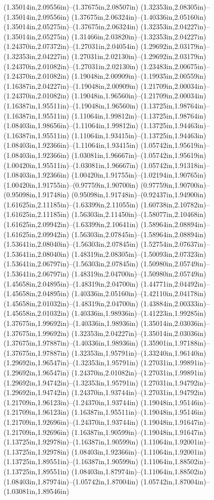 (1.35014in,2.09556in)--(1.37675in,2.08507in) (1.32353in,2.08305in)--(1.35014in,2.09556in) (1.37675in,2.06324in)--(1.40336in,2.05160in) (1.35014in,2.05275in)--(1.37675in,2.06324in) (1.32353in,2.04227in)--(1.35014in,2.05275in) (1.31466in,2.03820in)--(1.32353in,2.04227in) (1.24370in,2.07372in)--(1.27031in,2.04054in) (1.29692in,2.03179in)--(1.32353in,2.04227in) (1.27031in,2.02130in)--(1.29692in,2.03179in) (1.24370in,2.01082in)--(1.27031in,2.02130in) (1.23483in,2.00675in)--(1.24370in,2.01082in) (1.19048in,2.00909in)--(1.19935in,2.00559in) (1.16387in,2.04227in)--(1.19048in,2.00909in) (1.21709in,2.00034in)--(1.24370in,2.01082in) (1.19048in,1.96560in)--(1.21709in,2.00034in) (1.16387in,1.95511in)--(1.19048in,1.96560in) (1.13725in,1.98764in)--(1.16387in,1.95511in) (1.11064in,1.99812in)--(1.13725in,1.98764in) (1.08403in,1.98656in)--(1.11064in,1.99812in) (1.13725in,1.94463in)--(1.16387in,1.95511in) (1.11064in,1.93415in)--(1.13725in,1.94463in) (1.08403in,1.92366in)--(1.11064in,1.93415in) (1.05742in,1.95619in)--(1.08403in,1.92366in) (1.03081in,1.96667in)--(1.05742in,1.95619in) (1.00420in,1.95511in)--(1.03081in,1.96667in) (1.05742in,1.91318in)--(1.08403in,1.92366in) (1.00420in,1.91755in)--(1.02194in,1.90765in) (1.00420in,1.91755in)--(0.97759in,1.90700in) (0.97759in,1.90700in)--(0.95098in,1.91748in) (0.95098in,1.91748in)--(0.92437in,1.94900in) (1.61625in,2.11185in)--(1.63399in,2.11055in) (1.60738in,2.10782in)--(1.61625in,2.11185in) (1.56303in,2.11450in)--(1.58077in,2.10468in) (1.61625in,2.09942in)--(1.63399in,2.10641in) (1.58964in,2.08894in)--(1.61625in,2.09942in) (1.56303in,2.07845in)--(1.58964in,2.08894in) (1.53641in,2.08040in)--(1.56303in,2.07845in) (1.52754in,2.07637in)--(1.53641in,2.08040in) (1.48319in,2.08305in)--(1.50093in,2.07323in) (1.53641in,2.06797in)--(1.56303in,2.07845in) (1.50980in,2.05749in)--(1.53641in,2.06797in) (1.48319in,2.04700in)--(1.50980in,2.05749in) (1.45658in,2.04895in)--(1.48319in,2.04700in) (1.44771in,2.04492in)--(1.45658in,2.04895in) (1.40336in,2.05160in)--(1.42110in,2.04178in) (1.45658in,2.01032in)--(1.48319in,2.04700in) (1.43884in,2.00333in)--(1.45658in,2.01032in) (1.40336in,1.98936in)--(1.41223in,1.99285in) (1.37675in,1.99692in)--(1.40336in,1.98936in) (1.35014in,2.03036in)--(1.37675in,1.99692in) (1.32353in,2.04227in)--(1.35014in,2.03036in) (1.37675in,1.97887in)--(1.40336in,1.98936in) (1.35901in,1.97188in)--(1.37675in,1.97887in) (1.32353in,1.95791in)--(1.33240in,1.96140in) (1.29692in,1.96547in)--(1.32353in,1.95791in) (1.27031in,1.99891in)--(1.29692in,1.96547in) (1.24370in,2.01082in)--(1.27031in,1.99891in) (1.29692in,1.94742in)--(1.32353in,1.95791in) (1.27031in,1.94792in)--(1.29692in,1.94742in) (1.24370in,1.93744in)--(1.27031in,1.94792in) (1.21709in,1.96123in)--(1.24370in,1.93744in) (1.19048in,1.95146in)--(1.21709in,1.96123in) (1.16387in,1.95511in)--(1.19048in,1.95146in) (1.21709in,1.92696in)--(1.24370in,1.93744in) (1.19048in,1.91647in)--(1.21709in,1.92696in) (1.16387in,1.90599in)--(1.19048in,1.91647in) (1.13725in,1.92978in)--(1.16387in,1.90599in) (1.11064in,1.92001in)--(1.13725in,1.92978in) (1.08403in,1.92366in)--(1.11064in,1.92001in) (1.13725in,1.89551in)--(1.16387in,1.90599in) (1.11064in,1.88502in)--(1.13725in,1.89551in) (1.08403in,1.87974in)--(1.11064in,1.88502in) (1.08403in,1.87974in)--(1.05742in,1.87004in) (1.05742in,1.87004in)--(1.03081in,1.89546in) 